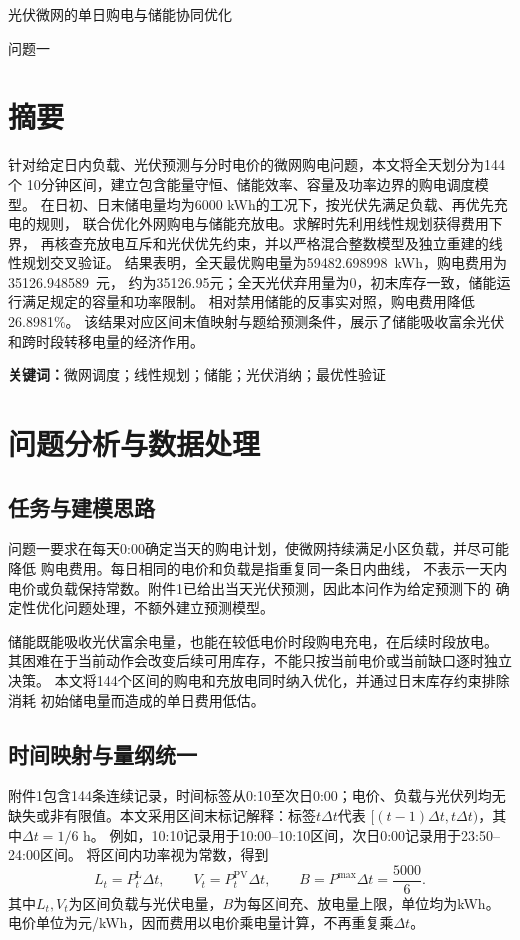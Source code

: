 \documentclass[UTF8,a4paper,12pt,fontset=fandol]{ctexart}
\newcommand{\Cost}{35126.948589}
\newcommand{\GridTotal}{59482.698998}
\newcommand{\SavingPercent}{26.8981}
\begin{document}
\begin{center}
  {\heiti\fontsize{20pt}{27pt}\selectfont
  光伏微网的单日购电与储能协同优化\par}
  \vspace{0.4em}
  {\large 问题一}
\end{center}

\section*{摘要}
针对给定日内负载、光伏预测与分时电价的微网购电问题，本文将全天划分为144个
10分钟区间，建立包含能量守恒、储能效率、容量及功率边界的购电调度模型。
在日初、日末储电量均为6000 kWh的工况下，按光伏先满足负载、再优先充电的规则，
联合优化外网购电与储能充放电。求解时先利用线性规划获得费用下界，
再核查充放电互斥和光伏优先约束，并以严格混合整数模型及独立重建的线性规划交叉验证。
结果表明，全天最优购电量为\GridTotal\ kWh，购电费用为\Cost\ 元，
约为35126.95元；全天光伏弃用量为0，初末库存一致，储能运行满足规定的容量和功率限制。
相对禁用储能的反事实对照，购电费用降低\SavingPercent\%。
该结果对应区间末值映射与题给预测条件，展示了储能吸收富余光伏和跨时段转移电量的经济作用。

\noindent\textbf{关键词：}微网调度；线性规划；储能；光伏消纳；最优性验证

\section{问题分析与数据处理}
\subsection{任务与建模思路}
问题一要求在每天0:00确定当天的购电计划，使微网持续满足小区负载，并尽可能降低
购电费用\cite{problem}。每日相同的电价和负载是指重复同一条日内曲线，
不表示一天内电价或负载保持常数。附件1已给出当天光伏预测，因此本问作为给定预测下的
确定性优化问题处理，不额外建立预测模型。

储能既能吸收光伏富余电量，也能在较低电价时段购电充电，在后续时段放电。
其困难在于当前动作会改变后续可用库存，不能只按当前电价或当前缺口逐时独立决策。
本文将144个区间的购电和充放电同时纳入优化，并通过日末库存约束排除消耗
初始储电量而造成的单日费用低估。

\subsection{时间映射与量纲统一}
附件1包含144条连续记录，时间标签从0:10至次日0:00；电价、负载与光伏列均无
缺失或非有限值。本文采用区间末标记解释：标签$t\Delta t$代表
$[(t-1)\Delta t,t\Delta t)$，其中$\Delta t=1/6$ h。
例如，10:10记录用于10:00--10:10区间，次日0:00记录用于23:50--24:00区间。
将区间内功率视为常数，得到
\begin{equation}
  L_t=P_t^{\mathrm L}\Delta t,\qquad
  V_t=P_t^{\mathrm{PV}}\Delta t,\qquad
  B=P^{\max}\Delta t=\frac{5000}{6}.
  \label{eq:units}
\end{equation}
其中$L_t,V_t$为区间负载与光伏电量，$B$为每区间充、放电量上限，单位均为kWh。
电价单位为元/kWh，因而费用以电价乘电量计算，不再重复乘$\Delta t$。
\end{document}

